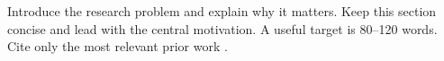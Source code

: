 
Introduce the research problem and explain why it matters. Keep this section
concise and lead with the central motivation. A useful target is 80--120 words.
Cite only the most relevant prior work
\cite{guo2017calibration,mitchell2019modelcards}.

